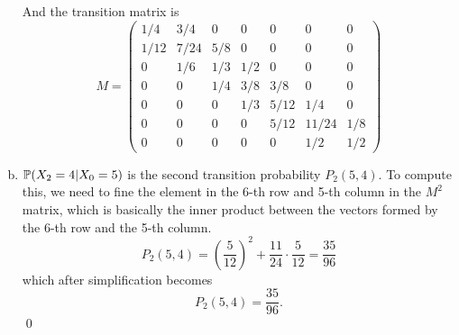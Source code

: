 \begin{solution}
\begin{enumerate}[(a)]
\begin{center}
		\end{center}
		And the transition matrix is
		\[  M =
		\begin{pmatrix}
			1/4 & 3/4 & 0 & 0 & 0 & 0 & 0 \\
			1/12 & 7/24 & 5/8 & 0 & 0 & 0 & 0 \\
			0 & 1/6 & 1/3 & 1/2 & 0 & 0 & 0 \\
			0 & 0 & 1/4 & 3/8 & 3/8 & 0 & 0 \\
			0 & 0 & 0 & 1/3 & 5/12 & 1/4 & 0 \\
			0 & 0 & 0 & 0 & 5/12 & 11/24 & 1/8 \\
			0 & 0 & 0 & 0 & 0 & 1/2 & 1/2
		\end{pmatrix}
		 \]
		 
		 \item $\mathbb{P}(X_2 = 4|X_0=5)$ is the second transition probability $P_2(5,4)$. To compute this, we need to fine the element in the 6-th row and 5-th column in the $M^2$ matrix, which is basically the inner product between the vectors formed by the 6-th row and the 5-th column.
		 \[ P_2(5,4) = (\frac{5}{12})^2 + \frac{11}{24}\cdot\frac{5}{12} = \frac{35}{96} \]
		 which after simplification becomes
		 \[ \boxed{P_2(5,4) = \frac{35}{96}}. \]
		\qed

		
		
		
	\end{enumerate}
	
\end{solution}